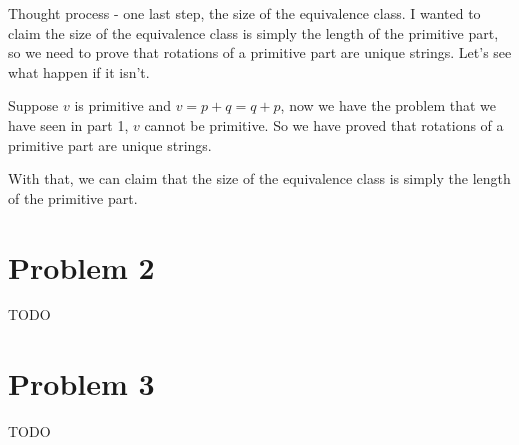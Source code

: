 \documentclass{article}
\begin{document}
Thought process - one last step, the size of the equivalence class. I wanted to claim the size of the equivalence class is simply the length of the primitive part, so we need to prove that rotations of a primitive part are unique strings. Let's see what happen if it isn't.

Suppose $ v $ is primitive and $ v = p + q = q + p $, now we have the problem that we have seen in part 1, $ v $ cannot be primitive. So we have proved that rotations of a primitive part are unique strings.

With that, we can claim that the size of the equivalence class is simply the length of the primitive part.



\section*{Problem 2}
TODO

\section*{Problem 3}
TODO
\end{document}

